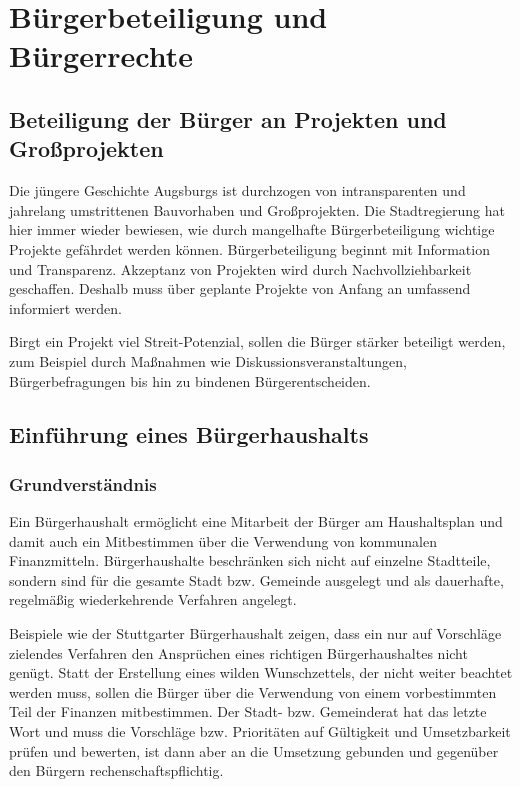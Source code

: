 \chapter{Bürgerbeteiligung und Bürgerrechte}
  
  \section{Beteiligung der Bürger an Projekten und Großprojekten}
  
  Die jüngere Geschichte Augsburgs ist durchzogen von intransparenten und 
  jahrelang umstrittenen Bauvorhaben und Großprojekten. Die Stadtregierung hat 
  hier immer wieder bewiesen, wie durch mangelhafte Bürgerbeteiligung wichtige 
  Projekte gefährdet werden können. Bürgerbeteiligung beginnt mit Information 
  und Transparenz. Akzeptanz von Projekten wird durch Nachvollziehbarkeit 
  geschaffen. Deshalb muss über geplante Projekte von Anfang an umfassend 
  informiert werden.
  
  Birgt ein Projekt viel Streit-Potenzial, sollen die Bürger stärker beteiligt 
  werden, zum Beispiel durch Maßnahmen wie Diskussionsveranstaltungen, 
  Bürgerbefragungen bis hin zu bindenen Bürgerentscheiden.
  
  \pagebreak
  \section{Einführung eines Bürgerhaushalts}

  \subsection{Grundverständnis}
  
  Ein Bürgerhaushalt ermöglicht eine Mitarbeit der Bürger am Haushaltsplan und 
  damit auch ein Mitbestimmen über die Verwendung von kommunalen 
  Finanzmitteln. Bürgerhaushalte beschränken sich nicht auf einzelne 
  Stadtteile, sondern sind für die gesamte Stadt bzw. Gemeinde ausgelegt und 
  als dauerhafte, regelmäßig wiederkehrende Verfahren angelegt.
  
  Beispiele wie der Stuttgarter Bürgerhaushalt zeigen, dass ein nur auf 
  Vorschläge zielendes Verfahren den Ansprüchen eines richtigen 
  Bürgerhaushaltes nicht genügt. Statt der Erstellung eines wilden 
  Wunschzettels, der nicht weiter beachtet werden muss, sollen die Bürger über 
  die Verwendung von einem vorbestimmten Teil der Finanzen mitbestimmen. Der 
  Stadt- bzw. Gemeinderat hat das letzte Wort und muss die Vorschläge bzw. 
  Prioritäten auf Gültigkeit und Umsetzbarkeit prüfen und bewerten, ist dann 
  aber an die Umsetzung gebunden und gegenüber den Bürgern 
  rechenschaftspflichtig.
  
